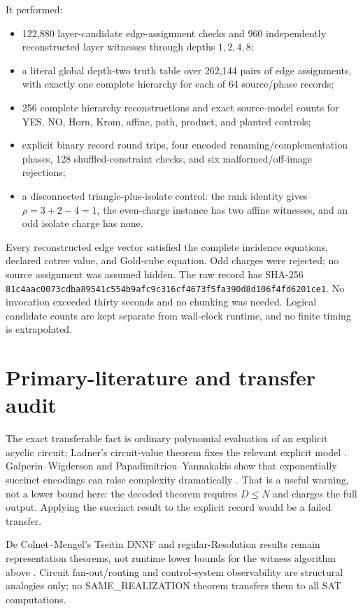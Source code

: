 \documentclass[11pt]{article}
\begin{document}
It performed:
\begin{itemize}
\item 122,880 layer-candidate edge-assignment checks and 960 independently
reconstructed layer witnesses through depths $1,2,4,8$;
\item a literal global depth-two truth table over 262,144 pairs of edge
assignments, with exactly one complete hierarchy for each of 64
source/phase records;
\item 256 complete hierarchy reconstructions and exact source-model counts
for YES, NO, Horn, Krom, affine, path, product, and planted controls;
\item explicit binary record round trips, four encoded
renaming/complementation phases, 128 shuffled-constraint checks, and six
malformed/off-image rejections;
\item a disconnected triangle-plus-isolate control: the rank identity gives
$\rho=3+2-4=1$, the even-charge instance has two affine witnesses, and an
odd isolate charge has none.
\end{itemize}

Every reconstructed edge vector satisfied the complete incidence equations,
declared cotree value, and Gold-cube equation.  Odd charges were rejected; no
source assignment was assumed hidden.  The raw record
has SHA-256
\texttt{81c4aac0073cdba89541c554b9afc9c316cf4673f5fa390d8d106f4fd6201ce1}.
No invocation exceeded thirty seconds and no chunking was needed.  Logical
candidate counts are kept separate from wall-clock runtime, and no finite
timing is extrapolated.

\section{Primary-literature and transfer audit}
The exact transferable fact is ordinary polynomial evaluation of an explicit
acyclic circuit; Ladner's circuit-value theorem fixes the relevant explicit
model \cite{Ladner}.  Galperin--Wigderson and
Papadimitriou--Yannakakis show that exponentially succinct encodings can
raise complexity dramatically \cite{GW,PY}.  That is a useful warning, not a
lower bound here: the decoded theorem requires $D\le N$ and charges the full
output.  Applying the succinct result to the explicit record would be a
failed transfer.

De Colnet--Mengel's Tseitin DNNF and regular-Resolution results remain
representation theorems, not runtime lower bounds for the witness algorithm
above \cite{CM}.  Circuit fan-out/routing and control-system observability are
structural analogies only; no SAME\_REALIZATION theorem transfers them to all
SAT computations.
\end{document}
